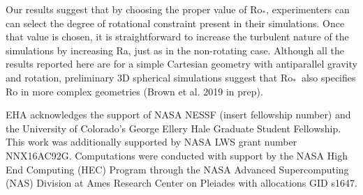 \documentclass[twocolumn, amsmath, amsfonts, amssymb]{aastex62}
\newcommand{\pro}{\ensuremath{\text{Ro}_{\text{*}}}}
\begin{document}
Our results suggest that by choosing the proper value of \pro, experimenters can
can select the degree of rotational constraint present in their simulations. 
Once that value is chosen, it is straightforward to increase the turbulent nature of 
the simulations by increasing Ra, just as in the non-rotating case. 
Although all the results reported here are for a simple Cartesian geometry with 
antiparallel gravity and rotation, preliminary 3D spherical simulations suggest that 
\pro$\,$ also specifies Ro in more complex geometries (Brown et al. 2019 in prep).


\begin{acknowledgements}
EHA acknowledges the support of NASA NESSF (insert fellowship number)
and the University of Colorado's George 
Ellery Hale Graduate Student Fellowship.
This work was additionally supported by  NASA LWS grant number NNX16AC92G.  
Computations were conducted 
with support by the NASA High End Computing (HEC) Program through the NASA 
Advanced Supercomputing (NAS) Division at Ames Research Center on Pleiades
with allocations GID s1647.
\end{acknowledgements}

\vspace{-1cm}

\end{document}
